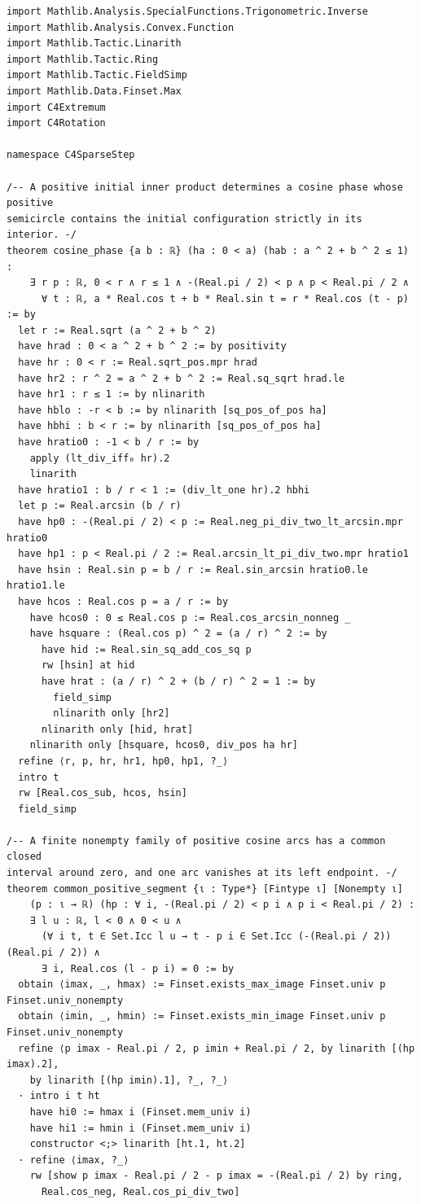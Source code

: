 \documentclass[11pt,a4paper]{article}
\begin{document}
\begin{Verbatim}[breaklines,breakanywhere,fontsize=\footnotesize]
import Mathlib.Analysis.SpecialFunctions.Trigonometric.Inverse
import Mathlib.Analysis.Convex.Function
import Mathlib.Tactic.Linarith
import Mathlib.Tactic.Ring
import Mathlib.Tactic.FieldSimp
import Mathlib.Data.Finset.Max
import C4Extremum
import C4Rotation

namespace C4SparseStep

/-- A positive initial inner product determines a cosine phase whose positive
semicircle contains the initial configuration strictly in its interior. -/
theorem cosine_phase {a b : ℝ} (ha : 0 < a) (hab : a ^ 2 + b ^ 2 ≤ 1) :
    ∃ r p : ℝ, 0 < r ∧ r ≤ 1 ∧ -(Real.pi / 2) < p ∧ p < Real.pi / 2 ∧
      ∀ t : ℝ, a * Real.cos t + b * Real.sin t = r * Real.cos (t - p) := by
  let r := Real.sqrt (a ^ 2 + b ^ 2)
  have hrad : 0 < a ^ 2 + b ^ 2 := by positivity
  have hr : 0 < r := Real.sqrt_pos.mpr hrad
  have hr2 : r ^ 2 = a ^ 2 + b ^ 2 := Real.sq_sqrt hrad.le
  have hr1 : r ≤ 1 := by nlinarith
  have hblo : -r < b := by nlinarith [sq_pos_of_pos ha]
  have hbhi : b < r := by nlinarith [sq_pos_of_pos ha]
  have hratio0 : -1 < b / r := by
    apply (lt_div_iff₀ hr).2
    linarith
  have hratio1 : b / r < 1 := (div_lt_one hr).2 hbhi
  let p := Real.arcsin (b / r)
  have hp0 : -(Real.pi / 2) < p := Real.neg_pi_div_two_lt_arcsin.mpr hratio0
  have hp1 : p < Real.pi / 2 := Real.arcsin_lt_pi_div_two.mpr hratio1
  have hsin : Real.sin p = b / r := Real.sin_arcsin hratio0.le hratio1.le
  have hcos : Real.cos p = a / r := by
    have hcos0 : 0 ≤ Real.cos p := Real.cos_arcsin_nonneg _
    have hsquare : (Real.cos p) ^ 2 = (a / r) ^ 2 := by
      have hid := Real.sin_sq_add_cos_sq p
      rw [hsin] at hid
      have hrat : (a / r) ^ 2 + (b / r) ^ 2 = 1 := by
        field_simp
        nlinarith only [hr2]
      nlinarith only [hid, hrat]
    nlinarith only [hsquare, hcos0, div_pos ha hr]
  refine ⟨r, p, hr, hr1, hp0, hp1, ?_⟩
  intro t
  rw [Real.cos_sub, hcos, hsin]
  field_simp

/-- A finite nonempty family of positive cosine arcs has a common closed
interval around zero, and one arc vanishes at its left endpoint. -/
theorem common_positive_segment {ι : Type*} [Fintype ι] [Nonempty ι]
    (p : ι → ℝ) (hp : ∀ i, -(Real.pi / 2) < p i ∧ p i < Real.pi / 2) :
    ∃ l u : ℝ, l < 0 ∧ 0 < u ∧
      (∀ i t, t ∈ Set.Icc l u → t - p i ∈ Set.Icc (-(Real.pi / 2)) (Real.pi / 2)) ∧
      ∃ i, Real.cos (l - p i) = 0 := by
  obtain ⟨imax, _, hmax⟩ := Finset.exists_max_image Finset.univ p Finset.univ_nonempty
  obtain ⟨imin, _, hmin⟩ := Finset.exists_min_image Finset.univ p Finset.univ_nonempty
  refine ⟨p imax - Real.pi / 2, p imin + Real.pi / 2, by linarith [(hp imax).2],
    by linarith [(hp imin).1], ?_, ?_⟩
  · intro i t ht
    have hi0 := hmax i (Finset.mem_univ i)
    have hi1 := hmin i (Finset.mem_univ i)
    constructor <;> linarith [ht.1, ht.2]
  · refine ⟨imax, ?_⟩
    rw [show p imax - Real.pi / 2 - p imax = -(Real.pi / 2) by ring,
      Real.cos_neg, Real.cos_pi_div_two]


\end{Verbatim}
\end{document}
